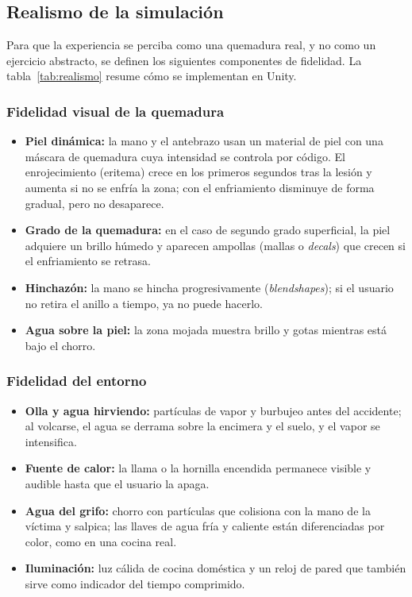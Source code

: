 \documentclass[11pt,letterpaper]{article}
\begin{document}
\subsection{Realismo de la simulación}
\label{sec:realismo}

Para que la experiencia se perciba como una quemadura real, y no como un ejercicio abstracto, se definen los siguientes componentes de fidelidad. La tabla~\ref{tab:realismo} resume cómo se implementan en Unity.

\subsubsection{Fidelidad visual de la quemadura}
\begin{itemize}
  \item \textbf{Piel dinámica:} la mano y el antebrazo usan un material de piel con una máscara de quemadura cuya intensidad se controla por código. El enrojecimiento (eritema) crece en los primeros segundos tras la lesión y aumenta si no se enfría la zona; con el enfriamiento disminuye de forma gradual, pero no desaparece.
  \item \textbf{Grado de la quemadura:} en el caso de segundo grado superficial, la piel adquiere un brillo húmedo y aparecen ampollas (mallas o \textit{decals}) que crecen si el enfriamiento se retrasa.
  \item \textbf{Hinchazón:} la mano se hincha progresivamente (\textit{blendshapes}); si el usuario no retira el anillo a tiempo, ya no puede hacerlo.
  \item \textbf{Agua sobre la piel:} la zona mojada muestra brillo y gotas mientras está bajo el chorro.
\end{itemize}

\subsubsection{Fidelidad del entorno}
\begin{itemize}
  \item \textbf{Olla y agua hirviendo:} partículas de vapor y burbujeo antes del accidente; al volcarse, el agua se derrama sobre la encimera y el suelo, y el vapor se intensifica.
  \item \textbf{Fuente de calor:} la llama o la hornilla encendida permanece visible y audible hasta que el usuario la apaga.
  \item \textbf{Agua del grifo:} chorro con partículas que colisiona con la mano de la víctima y salpica; las llaves de agua fría y caliente están diferenciadas por color, como en una cocina real.
  \item \textbf{Iluminación:} luz cálida de cocina doméstica y un reloj de pared que también sirve como indicador del tiempo comprimido.
\end{itemize}
\end{document}

